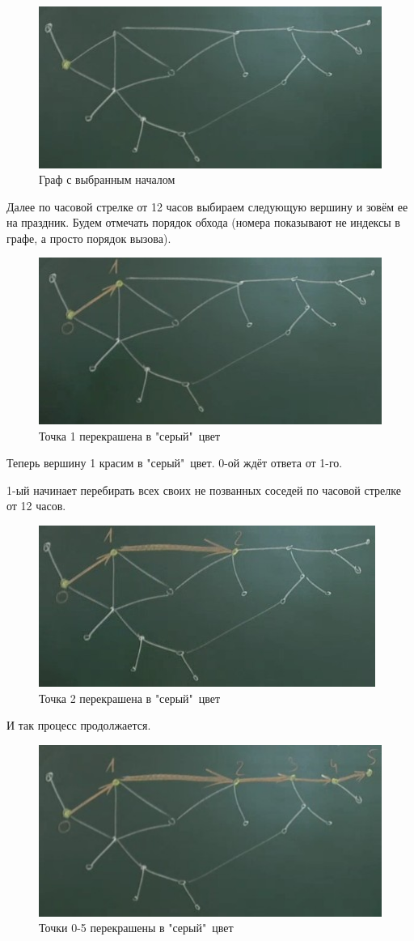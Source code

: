 \begin{figure}[h!]
	\centering
	\includegraphics[width=0.5\linewidth]{lection_18/alg1}
	\caption{Граф с выбранным началом}
\end{figure}
Далее по часовой стрелке от 12 часов выбираем следующую вершину и зовём ее на праздник. Будем отмечать порядок обхода (номера показывают не индексы в графе, а просто порядок вызова).

\begin{figure}[h!]
	\centering
	\includegraphics[width=0.5\linewidth]{lection_18/alg2}
	\caption{Точка 1 перекрашена в "серый"\ цвет}
\end{figure}

Теперь вершину 1 красим в "серый"\ цвет. 0-ой ждёт ответа от 1-го.

1-ый начинает перебирать всех своих не позванных соседей по часовой стрелке от 12 часов.
\vspace{10cm}

\begin{figure}[h!]
	\centering
	\includegraphics[width=0.5\linewidth]{lection_18/alg3}
	\caption{Точка 2 перекрашена в "серый"\ цвет}
\end{figure}

И так процесс продолжается.
\begin{figure}[h!]
	\centering
	\includegraphics[width=0.5\linewidth]{lection_18/alg4}
	\caption{Точки 0-5 перекрашены в "серый"\ цвет}
\end{figure}

